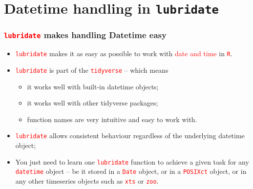 \documentclass{beamer}
\begin{document}
\section{Datetime handling in \texttt{lubridate}}

\begin{frame}\frametitle{\texttt{\textcolor{red}{lubridate}} makes handling Datetime easy}
\begin{itemize}
\item \texttt{\textcolor{red}{lubridate}} makes it as easy as possible to work with \textcolor{red}{date and time} in \texttt{\textcolor{red}{R}}.

\vspace{0.2in}
\item <2-> \texttt{\textcolor{red}{lubridate}} is part of the \texttt{\textcolor{red}{tidyverse}} -- which means
\begin{itemize}
\item it works well with built-in datetime objects;
\item it works well with other tidyverse packages;
\item function names are very intuitive and easy to work with.
\end{itemize}

\vspace{0.2in}

\item<3-> \texttt{\textcolor{red}{lubridate}} allows consistent behaviour regardless of the underlying datetime object;

\vspace{0.2in}
\item<4-> You just need to learn one \texttt{\textcolor{red}{lubridate}} function to achieve a given task for any \texttt{\textcolor{red}{datetime}} object -- be it stored in a \texttt{\textcolor{red}{Date}} object, or in a \texttt{\textcolor{red}{POSIXct}} object, or in any other timeseries objects such as \texttt{\textcolor{red}{xts}} or \texttt{\textcolor{red}{zoo}}.
\end{itemize}
\end{frame}
\end{document}
